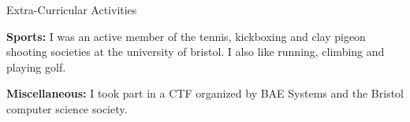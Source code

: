 \documentclass{resume} %
\begin{document}
\begin{rSection}{Extra-Curricular Activities} 
\vspace{-1.25em}

\item{\textbf{Sports:}}
I was an active member of the tennis, kickboxing and clay pigeon shooting societies at the university of bristol. I also like running, climbing and playing golf. \\

\vspace{-1.25em}

\item{\textbf{Miscellaneous:}}
I took part in a CTF organized by BAE Systems and the Bristol computer science society. \\

\end{rSection}
\end{document}

